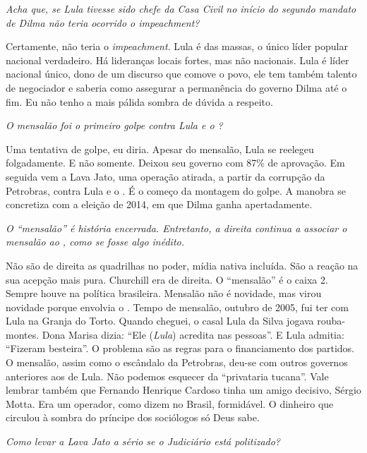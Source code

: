 \itshape
 Acha que, se Lula tivesse sido chefe da Casa Civil no
início do segundo mandato de Dilma não teria ocorrido o
\emph{impeachment}?

\normalfont
Certamente, não teria o \emph{impeachment}. Lula é das
massas, o único líder popular nacional verdadeiro. Há lideranças locais
fortes, mas não nacionais. Lula é líder nacional único, dono de um
discurso que comove o povo, ele tem também talento de negociador e
saberia como assegurar a permanência do governo Dilma até o fim. Eu não
tenho a mais pálida sombra de dúvida a respeito.

\itshape
 O mensalão foi o primeiro golpe contra Lula e o ?

\normalfont
Uma tentativa de golpe, eu diria. Apesar do mensalão,
Lula se reelegeu folgadamente. E não somente. Deixou seu governo com
87\% de aprovação. Em seguida vem a Lava Jato, uma operação atirada, a
partir da corrupção da Petrobras, contra Lula e o . É o começo da
montagem do golpe. A manobra se concretiza com a eleição de 2014, em que
Dilma ganha apertadamente.

\itshape
 O ``mensalão'' é história encerrada. Entretanto, a
direita continua a associar o mensalão ao , como se fosse algo
inédito.

\normalfont
Não são de direita as quadrilhas no poder, mídia nativa
incluída. São a reação na sua acepção mais pura. Churchill era de
direita. O ``mensalão'' é o caixa 2. Sempre houve na política
brasileira. Mensalão não é novidade, mas virou novidade porque envolvia
o . Tempo de mensalão, outubro de 2005, fui ter com Lula na Granja do
Torto. Quando cheguei, o casal Lula da Silva jogava rouba-montes. Dona
Marisa dizia: ``Ele (\emph{Lula}) acredita nas pessoas''. E Lula
admitia: ``Fizeram besteira''. O problema são as regras para o
financiamento dos partidos. O mensalão, assim como o escândalo da
Petrobras, deu-se com outros governos anteriores aos de Lula. Não
podemos esquecer da ``privataria tucana''. Vale lembrar também que
Fernando Henrique Cardoso tinha um amigo decisivo, Sérgio Motta. Era um
operador, como dizem no Brasil, formidável. O dinheiro que circulou à
sombra do príncipe dos sociólogos só Deus sabe.

\itshape
 Como levar a Lava Jato a sério se o Judiciário está
politizado?

